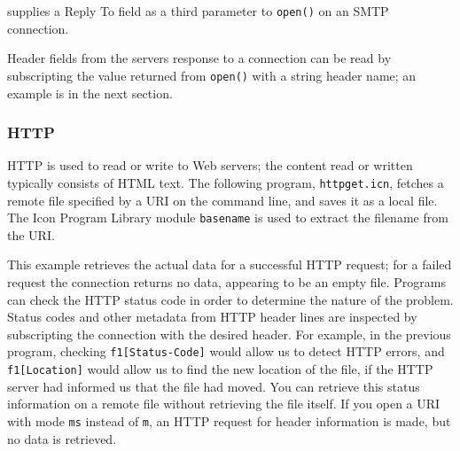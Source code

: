 
\noindent
supplies a Reply To field as a third parameter to \texttt{open()} on an
SMTP connection.

Header fields from the server{\textquotesingle}s response to a
connection can be read by subscripting the value returned from
\texttt{open()} with a string header name; an example is in the next
section.

\subsubsection{HTTP}

HTTP is used to read or write to Web servers; the content
read or written typically consists of HTML text. The
following program, \texttt{httpget.icn}, fetches a remote file
specified by a URI on the command line, and saves it as a local file.
The Icon Program Library module \texttt{basename} is used to extract
the filename from the URI.



This example retrieves the actual data for a successful HTTP request;
for a failed request the connection returns no data, appearing to be an
empty file. Programs can check the HTTP status code in order to
determine the nature of the problem. Status codes and other metadata
from HTTP header lines are inspected by subscripting the connection
with the desired header. For example, in the previous program, checking
\texttt{f1[{\textquotedbl}Status-Code{\textquotedbl}]} would allow us
to detect HTTP errors, and
\texttt{f1[{\textquotedbl}Location{\textquotedbl}]} would allow us to
find the new location of the file, if the HTTP server had informed us
that the file had moved. You can retrieve this status information on a
remote file without retrieving the file itself. If you open a URI with
mode \texttt{{\textquotedbl}ms{\textquotedbl}} instead of
\texttt{{\textquotedbl}m{\textquotedbl}}, an HTTP request for header
information is made, but no data is retrieved.

